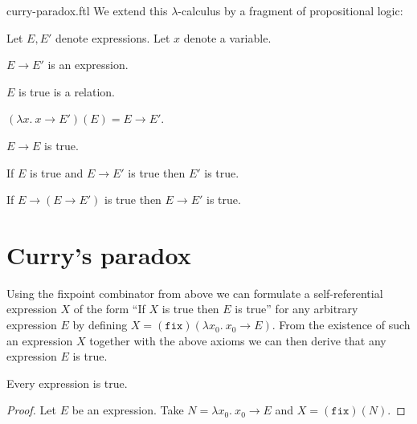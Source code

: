 \documentclass{stex}
\newcommand{\varzero}{x_0}
\newcommand{\abs}[2]{\lambda#1.\ #2}
\newcommand{\app}[2]{(#1)(#2)}
\newcommand{\fix}{\texttt{fix}}
\begin{document}
\begin{smodule}{curry-paradox.ftl}
\noindent We extend this $\lambda$-calculus by a fragment of propositional
logic:

\begin{forthel}  
  Let $E, E'$ denote expressions.
  Let $x$ denote a variable.

  \begin{signature*}[title=Implication,id=implication]
    $E \rightarrow E'$ is an expression.
  \end{signature*}

  \begin{signature*}[title=Truth,id=truth]
    $E$ is true is a relation.
  \end{signature*}

  \begin{axiom*}[title=$\beta$-reduction,id=beta_reduction]
    $\app{\abs{x}{x \rightarrow E'}}{E} = E \rightarrow E'$.
  \end{axiom*}

  \begin{axiom*}[title=Reflexivity,id=reflexivity]
    $E \rightarrow E$ is true.
  \end{axiom*}

  \begin{axiom*}[title=Modus Ponens,id=modus_ponens]
    If $E$ is true and $E \rightarrow E'$ is true then $E'$ is true.
  \end{axiom*}

  \begin{axiom*}[title=Strengthening,id=strengthening]
    If $E \rightarrow (E \rightarrow E')$ is true then $E \rightarrow E'$ is true.
  \end{axiom*}
\end{forthel}


\section*{Curry's paradox}

\noindent Using the fixpoint combinator from above we can formulate a 
self-referential expression $X$ of the form ``If $X$ is true then $E$ is
true'' for any arbitrary expression $E$ by defining
$X = \app{\fix}{\abs{\varzero}{\varzero \rightarrow E}}$.
From the existence of such an expression $X$ together with the above axioms 
we can then derive that any expression $E$ is true.

\begin{forthel}
  \begin{theorem*}[title=Curry's Paradox,id=curry_paradox]
    Every expression is true.
  \end{theorem*}
  \begin{proof}
    Let $E$ be an expression.
    Take $N = \abs{\varzero}{\varzero \rightarrow E}$ and $X = \app{\fix}{N}.$


\end{proof}
\end{forthel}
\end{smodule}
\end{document}
